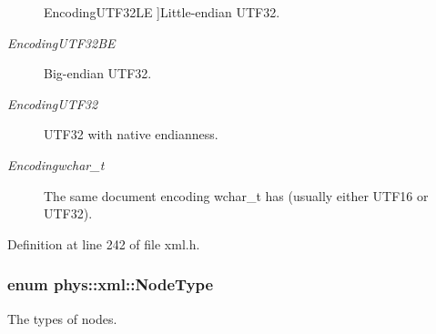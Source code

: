 \begin{Desc}
\begin{description}
{{EncodingUTF32LE}
\label{d9/d27/namespacephys_1_1xml_a420f5de782438f88160321385bea2015a127752883aaf8c9bdb5f66ec725211fc}
}]Little-\/endian UTF32. \item[{\em 
\hypertarget{namespacephys_1_1xml_a420f5de782438f88160321385bea2015a5fb13deaf1552b0f4c00e2b8cafce0b9}{
EncodingUTF32BE}
\label{d9/d27/namespacephys_1_1xml_a420f5de782438f88160321385bea2015a5fb13deaf1552b0f4c00e2b8cafce0b9}
}]Big-\/endian UTF32. \item[{\em 
\hypertarget{namespacephys_1_1xml_a420f5de782438f88160321385bea2015ac61c2f632bd66c2466c29783beb33f8a}{
EncodingUTF32}
\label{d9/d27/namespacephys_1_1xml_a420f5de782438f88160321385bea2015ac61c2f632bd66c2466c29783beb33f8a}
}]UTF32 with native endianness. \item[{\em 
\hypertarget{namespacephys_1_1xml_a420f5de782438f88160321385bea2015a2bc9c8d42796901c8feaa25e17c56cef}{
Encodingwchar\_\-t}
\label{d9/d27/namespacephys_1_1xml_a420f5de782438f88160321385bea2015a2bc9c8d42796901c8feaa25e17c56cef}
}]The same document encoding wchar\_\-t has (usually either UTF16 or UTF32). \end{description}
\end{Desc}



Definition at line 242 of file xml.h.

\hypertarget{namespacephys_1_1xml_a668b0cc666a9d49f7c7222a7552115d3}{
\subsubsection[{NodeType}]{\setlength{\rightskip}{0pt plus 5cm}enum {\bf phys::xml::NodeType}}}
\label{d9/d27/namespacephys_1_1xml_a668b0cc666a9d49f7c7222a7552115d3}


The types of nodes. 

